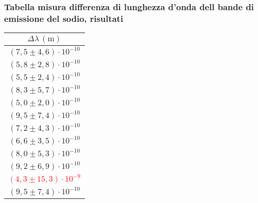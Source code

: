 \subsubsection{Tabella misura differenza di lunghezza d'onda dell bande di emissione del sodio, risultati}
    \begin{table}[H]
    \centering
        \begin{tabular}{|c|}
        \hline
        $ \Delta \lambda \, (\text{m}) $ \\
        \hline
        $(7{,}5 \pm 4{,}6) \cdot 10^{-10}$ \\
        \hline
        $(5{,}8 \pm 2{,}8) \cdot 10^{-10}$ \\
        \hline
        $(5{,}5 \pm 2{,}4) \cdot 10^{-10}$ \\
        \hline
        $(8{,}3 \pm 5{,}7) \cdot 10^{-10}$ \\
        \hline
        $(5{,}0 \pm 2{,}0) \cdot 10^{-10}$ \\
        \hline
        $(9{,}5 \pm 7{,}4) \cdot 10^{-10}$ \\
        \hline
        $(7{,}2 \pm 4{,}3) \cdot 10^{-10}$ \\
        \hline
        $(6{,}6 \pm 3{,}5) \cdot 10^{-10}$ \\
        \hline
        $(8{,}0 \pm 5{,}3) \cdot 10^{-10}$ \\
        \hline
        $(9{,}2 \pm 6{,}9) \cdot 10^{-10}$ \\
        \hline
        \textcolor{red}{$(4{,}3 \pm 15{,}3) \cdot 10^{-9}$} \\
        \hline
        $(9{,}5 \pm 7{,}4) \cdot 10^{-10}$ \\
        \hline
        \end{tabular}
    \end{table}